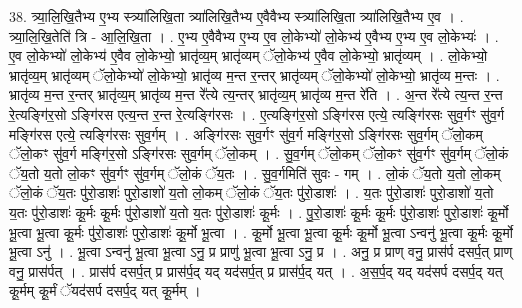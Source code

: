 \documentclass[17pt]{extarticle}
\begin{document}
38. त्र्या॒लि॒खि॒तैभ्य ए॒भ्य स्त्र्या॑लिखि॒ता त्र्या॑लिखि॒तैभ्य ए॒वैवैभ्य स्त्र्या॑लिखि॒ता त्र्या॑लिखि॒तैभ्य ए॒व । . त्र्या॒लि॒खि॒तेति॑ त्रि - आ॒लि॒खि॒ता । . ए॒भ्य ए॒वैवैभ्य ए॒भ्य ए॒व लो॒केभ्यो॑ लो॒केभ्य॑ ए॒वैभ्य ए॒भ्य ए॒व लो॒केभ्यः॑ । . ए॒व लो॒केभ्यो॑ लो॒केभ्य॑ ए॒वैव लो॒केभ्यो॒ भ्रातृ॑व्य॒म् भ्रातृ॑व्यम् ॅलो॒केभ्य॑ ए॒वैव लो॒केभ्यो॒ भ्रातृ॑व्यम् । . लो॒केभ्यो॒ भ्रातृ॑व्य॒म् भ्रातृ॑व्यम् ॅलो॒केभ्यो॑ लो॒केभ्यो॒ भ्रातृ॑व्य म॒न्त र॒न्तर् भ्रातृ॑व्यम् ॅलो॒केभ्यो॑ लो॒केभ्यो॒ भ्रातृ॑व्य म॒न्तः । . भ्रातृ॑व्य म॒न्त र॒न्तर् भ्रातृ॑व्य॒म् भ्रातृ॑व्य म॒न्त रे᳚त्ये त्य॒न्तर् भ्रातृ॑व्य॒म् भ्रातृ॑व्य म॒न्त रे॑ति । . अ॒न्त रे᳚त्ये त्य॒न्त र॒न्त रे॒त्यङ्गि॑र॒सो ऽङ्गि॑रस एत्य॒न्त र॒न्त रे॒त्यङ्गि॑रसः । . ए॒त्यङ्गि॑र॒सो ऽङ्गि॑रस एत्ये॒ त्यङ्गि॑रसः सुव॒र्गꣳ सु॑व॒र्ग मङ्गि॑रस एत्ये॒ त्यङ्गि॑रसः सुव॒र्गम् । . अङ्गि॑रसः सुव॒र्गꣳ सु॑व॒र्ग मङ्गि॑र॒सो ऽङ्गि॑रसः सुव॒र्गम् ॅलो॒कम् ॅलो॒कꣳ सु॑व॒र्ग मङ्गि॑र॒सो ऽङ्गि॑रसः सुव॒र्गम् ॅलो॒कम् । . सु॒व॒र्गम् ॅलो॒कम् ॅलो॒कꣳ सु॑व॒र्गꣳ सु॑व॒र्गम् ॅलो॒कं ॅय॒तो य॒तो लो॒कꣳ सु॑व॒र्गꣳ सु॑व॒र्गम् ॅलो॒कं ॅय॒तः । . सु॒व॒र्गमिति॑ सुवः - गम् । . लो॒कं ॅय॒तो य॒तो लो॒कम् ॅलो॒कं ॅय॒तः पु॑रो॒डाशः॑ पुरो॒डाशो॑ य॒तो लो॒कम् ॅलो॒कं ॅय॒तः पु॑रो॒डाशः॑ । . य॒तः पु॑रो॒डाशः॑ पुरो॒डाशो॑ य॒तो य॒तः पु॑रो॒डाशः॑ कू॒र्मः कू॒र्मः पु॑रो॒डाशो॑ य॒तो य॒तः पु॑रो॒डाशः॑ कू॒र्मः । . पु॒रो॒डाशः॑ कू॒र्मः कू॒र्मः पु॑रो॒डाशः॑ पुरो॒डाशः॑ कू॒र्मो भू॒त्वा भू॒त्वा कू॒र्मः पु॑रो॒डाशः॑ पुरो॒डाशः॑ कू॒र्मो भू॒त्वा । . कू॒र्मो भू॒त्वा भू॒त्वा कू॒र्मः कू॒र्मो भू॒त्वा ऽन्वनु॑ भू॒त्वा कू॒र्मः कू॒र्मो भू॒त्वा ऽनु॑ । . भू॒त्वा ऽन्वनु॑ भू॒त्वा भू॒त्वा ऽनु॒ प्र प्राणु॑ भू॒त्वा भू॒त्वा ऽनु॒ प्र । . अनु॒ प्र प्राण् वनु॒ प्रास॑र्प दसर्प॒त् प्राण् वनु॒ प्रास॑र्पत् । . प्रास॑र्प दसर्प॒त् प्र प्रास॑र्प॒द् यद् यद॑सर्प॒त् प्र प्रास॑र्प॒द् यत् । . अ॒स॒र्प॒द् यद् यद॑सर्प दसर्प॒द् यत् कू॒र्मम् कू॒र्मं ॅयद॑सर्प दसर्प॒द् यत् कू॒र्मम् । \newline
\pagebreak
{}
\end{document}
